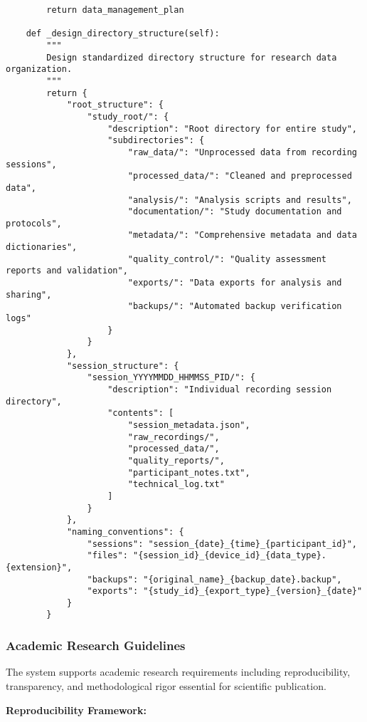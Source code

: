 \documentclass[12pt,a4paper]{article}
\begin{document}
\begin{verbatim}
        return data_management_plan
    
    def _design_directory_structure(self):
        """
        Design standardized directory structure for research data organization.
        """
        return {
            "root_structure": {
                "study_root/": {
                    "description": "Root directory for entire study",
                    "subdirectories": {
                        "raw_data/": "Unprocessed data from recording sessions",
                        "processed_data/": "Cleaned and preprocessed data",
                        "analysis/": "Analysis scripts and results",
                        "documentation/": "Study documentation and protocols",
                        "metadata/": "Comprehensive metadata and data dictionaries",
                        "quality_control/": "Quality assessment reports and validation",
                        "exports/": "Data exports for analysis and sharing",
                        "backups/": "Automated backup verification logs"
                    }
                }
            },
            "session_structure": {
                "session_YYYYMMDD_HHMMSS_PID/": {
                    "description": "Individual recording session directory",
                    "contents": [
                        "session_metadata.json",
                        "raw_recordings/",
                        "processed_data/",
                        "quality_reports/",
                        "participant_notes.txt",
                        "technical_log.txt"
                    ]
                }
            },
            "naming_conventions": {
                "sessions": "session_{date}_{time}_{participant_id}",
                "files": "{session_id}_{device_id}_{data_type}.{extension}",
                "backups": "{original_name}_{backup_date}.backup",
                "exports": "{study_id}_{export_type}_{version}_{date}"
            }
        }
\end{verbatim}

\subsubsection{Academic Research Guidelines}

The system supports academic research requirements including reproducibility, transparency, and methodological rigor
essential for scientific publication.

\textbf{Reproducibility Framework:}
\end{document}
